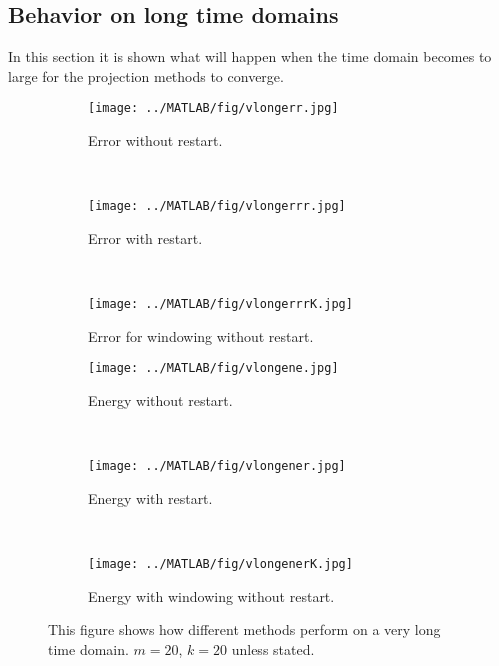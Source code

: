 \subsection{Behavior on long time domains} %
In this section it is shown what will happen when the time domain becomes to large for the projection methods to converge.
\label{sec:longtime}
\begin{figure}[H]
        \centering
        \begin{subfigure}[b]{0.3\textwidth}
                \texttt{[image: ../MATLAB/fig/vlongerr.jpg]}
                \caption{ Error without restart. }
                \label{fig:vlongerr}
        \end{subfigure}
		~
        \begin{subfigure}[b]{0.3\textwidth}
                \texttt{[image: ../MATLAB/fig/vlongerrr.jpg]}
                \caption{ Error with restart. }
                \label{fig:vlongerrr}
        \end{subfigure}
        ~
		\begin{subfigure}[b]{0.3\textwidth}
                \texttt{[image: ../MATLAB/fig/vlongerrrK.jpg]}
                \caption{ Error for windowing without restart. }
                \label{fig:vlongerrrK}
        \end{subfigure}
        
		\begin{subfigure}[b]{0.3\textwidth}
                \texttt{[image: ../MATLAB/fig/vlongene.jpg]}
                \caption{ Energy without restart. }
                \label{fig:vlongene}
        \end{subfigure}
		~
		\begin{subfigure}[b]{0.3\textwidth}
                \texttt{[image: ../MATLAB/fig/vlongener.jpg]}
                \caption{ Energy with restart. }
                \label{fig:vlongener}
        \end{subfigure}
        ~
		\begin{subfigure}[b]{0.3\textwidth}
                \texttt{[image: ../MATLAB/fig/vlongenerK.jpg]}
                \caption{ Energy with windowing without restart. }
                \label{fig:vlongenerK}
        \end{subfigure}        
        
        \caption{ This figure shows how different methods perform on a very long time domain.  $m = 20$, $k = 20$ unless stated. }
        \label{fig:vlong}
\end{figure}
